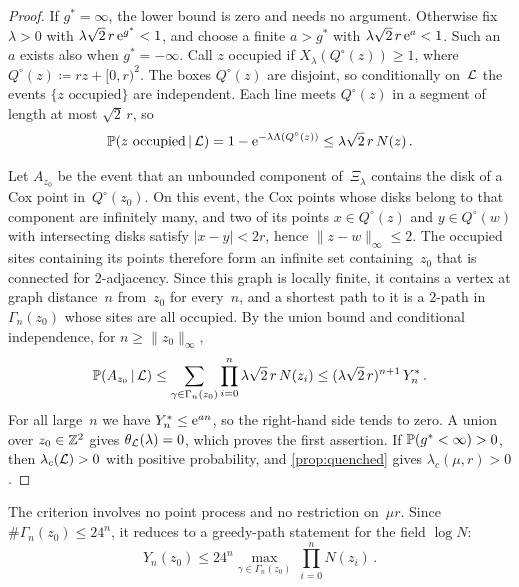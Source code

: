 \documentclass[11pt,letterpaper]{article}
\begin{document}
\begin{proof}
If $g^*=\infty$, the lower bound is zero and needs no argument. Otherwise fix $\lambda>0$ with $\lambda\sqrt2\,r\,\e^{g^*}<1$, and choose a finite $a>g^*$ with $\lambda\sqrt2\,r\,\e^a<1$. Such an $a$ exists also when $g^*=-\infty$. Call $z$ occupied if $X_\lambda(Q^\circ(z))\ge1$, where $Q^\circ(z)\coloneqq rz+[0,r)^2$. The boxes $Q^\circ(z)$ are disjoint, so conditionally on~$\cL$ the events $\{z\text{ occupied}\}$ are independent. Each line meets $Q^\circ(z)$ in a segment of length at most $\sqrt2\,r$, so
\begin{equation*}
  \P(z\text{ occupied}\,\vert\,\cL)=1-\e^{-\lambda\Lambda(Q^\circ(z))}\le\lambda\sqrt2\,r\,N(z)\,.
\end{equation*}

Let $A_{z_0}$ be the event that an unbounded component of~$\Xi_\lambda$ contains the disk of a Cox point in~$Q^\circ(z_0)$. On this event, the Cox points whose disks belong to that component are infinitely many, and two of its points $x\in Q^\circ(z)$ and $y\in Q^\circ(w)$ with intersecting disks satisfy $\lvert x-y\rvert<2r$, hence $\lVert z-w\rVert_\infty\le2$. The occupied sites containing its points therefore form an infinite set containing~$z_0$ that is connected for $2$-adjacency. Since this graph is locally finite, it contains a vertex at graph distance~$n$ from~$z_0$ for every~$n$, and a shortest path to it is a $2$-path in $\Gamma_n(z_0)$ whose sites are all occupied. By the union bound and conditional independence, for $n\ge\lVert z_0\rVert_\infty$,
\begin{equation*}
  \P(A_{z_0}\,\vert\,\cL)\le\sum_{\gamma\in\Gamma_n(z_0)}\prod_{i=0}^n\lambda\sqrt2\,r\,N(z_i)\le(\lambda\sqrt2\,r)^{n+1}\,Y_n^*\,.
\end{equation*}
For all large~$n$ we have $Y_n^*\le\e^{an}$, so the right-hand side tends to zero. A union over $z_0\in\Z^2$ gives $\theta_\cL(\lambda)=0$, which proves the first assertion. If $\P(g^*<\infty)>0$, then $\lambda_c(\cL)>0$ with positive probability, and \cref{prop:quenched} gives $\lambda_c(\mu,r)>0$.
\end{proof}

The criterion involves no point process and no restriction on~$\mu r$. Since $\#\Gamma_n(z_0)\le24^n$, it reduces to a greedy-path statement for the field $\log N$:
\begin{equation*}
  Y_n(z_0)\le24^n\max_{\gamma\in\Gamma_n(z_0)}\ \prod_{i=0}^nN(z_i)\,.
\end{equation*}
\end{document}
